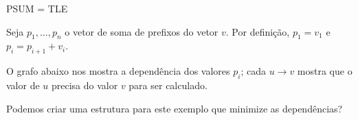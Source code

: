 \begin{frame}{PSUM = TLE}

    Seja $p_1, \dots, p_n$ o vetor de soma de prefixos do vetor $v$. Por definição, $p_1 = v_1$ e $p_i = p_{i+1} + v_i$.

    O grafo abaixo nos mostra a dependência dos valores $p_i$; cada $u \to v$ mostra que o valor de $u$ precisa do valor $v$ para ser calculado.

    \begin{center}
    \end{center}

    Podemos criar uma estrutura para este exemplo que minimize as dependências?
    

\end{frame}
